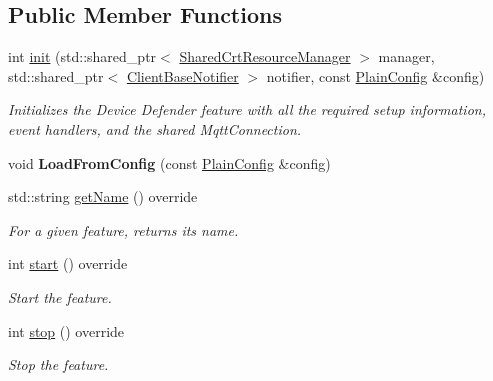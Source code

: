 \subsection*{Public Member Functions}
\begin{DoxyCompactItemize}
\item 
int \hyperlink{class_aws_1_1_iot_1_1_device_client_1_1_device_defender_1_1_device_defender_feature_a7fe61ca792baf877da7bbbd00e81629b}{init} (std\+::shared\+\_\+ptr$<$ \hyperlink{class_aws_1_1_iot_1_1_device_client_1_1_shared_crt_resource_manager}{Shared\+Crt\+Resource\+Manager} $>$ manager, std\+::shared\+\_\+ptr$<$ \hyperlink{class_aws_1_1_iot_1_1_device_client_1_1_client_base_notifier}{Client\+Base\+Notifier} $>$ notifier, const \hyperlink{struct_aws_1_1_iot_1_1_device_client_1_1_plain_config}{Plain\+Config} \&config)
\begin{DoxyCompactList}\small\item\em Initializes the Device Defender feature with all the required setup information, event handlers, and the shared Mqtt\+Connection. \end{DoxyCompactList}\item 
\mbox{\label{class_aws_1_1_iot_1_1_device_client_1_1_device_defender_1_1_device_defender_feature_a9756456b46159446a17e93d65028963b}} 
void {\bfseries Load\+From\+Config} (const \hyperlink{struct_aws_1_1_iot_1_1_device_client_1_1_plain_config}{Plain\+Config} \&config)
\item 
std\+::string \hyperlink{class_aws_1_1_iot_1_1_device_client_1_1_device_defender_1_1_device_defender_feature_a5d1c425fb35d74caff528e7b59026211}{get\+Name} () override
\begin{DoxyCompactList}\small\item\em For a given feature, returns its name. \end{DoxyCompactList}\item 
int \hyperlink{class_aws_1_1_iot_1_1_device_client_1_1_device_defender_1_1_device_defender_feature_aeede868840f237a50d394c779a8a9026}{start} () override
\begin{DoxyCompactList}\small\item\em Start the feature. \end{DoxyCompactList}\item 
int \hyperlink{class_aws_1_1_iot_1_1_device_client_1_1_device_defender_1_1_device_defender_feature_a93b78c0fe8518baabdff3d38544b9d00}{stop} () override
\begin{DoxyCompactList}\small\item\em Stop the feature. \end{DoxyCompactList}\end{DoxyCompactItemize}
